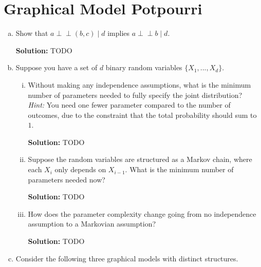\documentclass{article}
\newcommand{\Question}[1]{\Large \section{ #1 } \normalsize}
\newcommand{\statind}{\perp\!\!\!\perp}
\newenvironment{solution}{\color{blue} \smallskip \textbf{Solution:}}{}
\begin{document}
\newpage
\Question{Graphical Model Potpourri}
\begin{enumerate}[(a)]
    \item
    Show that $a \statind (b, c) \mid d$ implies $a \statind b \mid d$.

    \begin{solution}
        TODO
    \end{solution}

    \newpage
    \item 
    Suppose you have a set of $d$ binary random variables $\{X_1, ..., X_d\}$.
    \begin{enumerate}[(i)]
        \item 
        Without making any independence assumptions, what is the minimum number of parameters needed to fully specify the joint distribution? \\
        \textit{Hint:} You need one fewer parameter compared to the number of outcomes, due to the constraint that the total probability should sum to $1$.

        \begin{solution}
            TODO
        \end{solution}
        
        \item 
        Suppose the random variables are structured as a Markov chain, where each $X_i$ only depends on $X_{i-1}$. What is the minimum number of parameters needed now?

        \begin{solution}
            TODO
        \end{solution}
        
        \item 
        How does the parameter complexity change going from no independence assumption to a Markovian assumption?

        \begin{solution}
            TODO
        \end{solution}
    \end{enumerate}

    \newpage
    \item 
    Consider the following three graphical models with distinct structures.
    \begin{center}
\end{center}
\end{enumerate}
\end{document}
